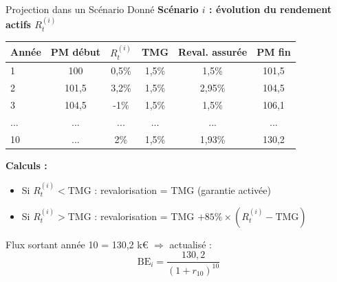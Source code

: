 \documentclass[10pt,aspectratio=169,xcolor={dvipsnames}]{beamer}
\newcommand{\BE}{\text{BE}}
\begin{document}
\begin{frame}{Projection dans un Scénario Donné}
\textbf{Scénario $i$ : évolution du rendement actifs $R^{(i)}_t$}

\begin{table}
\centering
\scriptsize
\begin{tabular}{lccccc}
\toprule
\textbf{Année} & \textbf{PM début} & \textbf{$R^{(i)}_t$} & \textbf{TMG} & \textbf{Reval. assurée} & \textbf{PM fin} \\
\midrule
1 & 100 & 0,5\% & 1,5\% & 1,5\% & 101,5 \\
2 & 101,5 & 3,2\% & 1,5\% & 2,95\% & 104,5 \\
3 & 104,5 & -1\% & 1,5\% & 1,5\% & 106,1 \\
... & ... & ... & ... & ... & ... \\
10 & ... & 2\% & 1,5\% & 1,93\% & 130,2 \\
\bottomrule
\end{tabular}
\end{table}

\vspace{0.2cm}
\textbf{Calculs :}
\begin{itemize}
    \item Si $R^{(i)}_t < \text{TMG}$ : revalorisation = TMG (garantie activée)
    \item Si $R^{(i)}_t > \text{TMG}$ : revalorisation = TMG $+ 85\% \times (R^{(i)}_t - \text{TMG})$
\end{itemize}

\vspace{0.2cm}
Flux sortant année 10 = 130,2 k€ $\Rightarrow$ actualisé :
\[
\BE_i = \frac{130,2}{(1+r_{10})^{10}}
\]
\end{frame}
\end{document}
